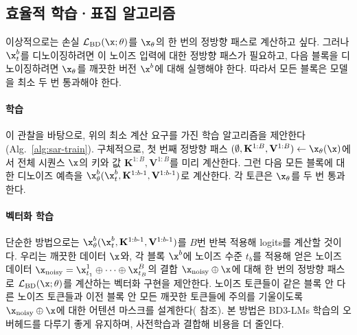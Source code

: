 \documentclass{article} %
\def\algos{BD3-LMs}
\begin{document}


\subsection{효율적 학습·표집 알고리즘}\label{sec:eff-algs}

이상적으로는 손실 $\mathcal{L}_\text{BD}(\x; \theta)$를 $\x_\theta$의 한 번의 정방향 패스로 계산하고 싶다. 그러나 $\x_t^b$를 디노이징하려면 이 노이즈 입력에 대한 정방향 패스가 필요하고, 다음 블록을 디노이징하려면 $\x_\theta$를 깨끗한 버전 $\x^b$에 대해 실행해야 한다. 따라서 모든 블록은 모델을 최소 두 번 통과해야 한다.

\paragraph{학습}
이 관찰을 바탕으로, 위의 최소 계산 요구를 가진 학습 알고리즘을 제안한다
%
(Alg.~\ref{alg:sar-train}). 구체적으로, 첫 번째 정방향 패스 $(\emptyset, \mathbf{K}^{1:B}, \mathbf{V}^{1:B}) \gets \x_\theta(\x)$에서 전체 시퀀스 $\x$의 키와 값 $\mathbf{K}^{1:B}, \mathbf{V}^{1:B}$를 미리 계산한다.
그런 다음 모든 블록에 대한 디노이즈 예측을 $\x_\theta^b(\x_{t}^b,  \mathbf{K}^{1:b\text{-}1}, \mathbf{V}^{1:b\text{-}1})$로 계산한다. 각 토큰은 $\x_\theta$를 두 번 통과한다.

\paragraph{벡터화 학습}

단순한 방법으로는 $\x_\theta^b(\x_{t}^b,  \mathbf{K}^{1:b\text{-}1}, \mathbf{V}^{1:b\text{-}1})$를 $B$번 반복 적용해 logits를 계산할 것이다. 우리는 깨끗한 데이터 $\x$와, 각 블록 $\x^b$에 노이즈 수준 $t_b$를 적용해 얻은 노이즈 데이터 $\x_\text{noisy} = \x^1_{t_1} \oplus \dots \oplus \x^B_{t_B}$의 결합 $\x_\text{noisy} \oplus \x$에 대해 한 번의 정방향 패스로 $\mathcal{L}_\text{BD}(\x; \theta)$를 계산하는 벡터화 구현을 제안한다. 노이즈 토큰들이 같은 블록 안 다른 노이즈 토큰들과 이전 블록 안 모든 깨끗한 토큰들에 주의를 기울이도록 $\x_\text{noisy} \oplus \x$에 대한 어텐션 마스크를 설계한다( 참조). 본 방법은 \algos{} 학습의 오버헤드를 다루기 좋게 유지하며, 사전학습과 결합해 비용을 더 줄인다.
\end{document}
